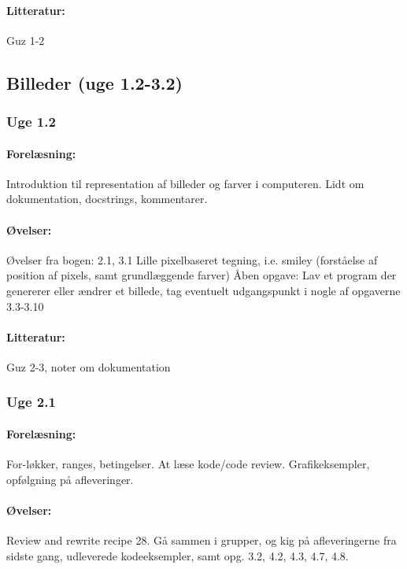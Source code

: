 \documentclass[12pt]{article}
\begin{document}
\paragraph{Litteratur:} Guz 1-2


\subsection{Billeder (uge 1.2-3.2) }


\subsubsection{Uge 1.2}
\paragraph{Forelæsning:} 
Introduktion til representation af billeder og farver i computeren. Lidt om dokumentation, docstrings, kommentarer.

\paragraph{Øvelser:}
Øvelser fra bogen: 2.1, 3.1
Lille pixelbaseret tegning, i.e. smiley (forståelse af position af pixels, samt grundlæggende farver) 
Åben opgave: Lav et program der genererer eller ændrer et billede, tag eventuelt udgangspunkt i nogle af opgaverne 3.3-3.10

\paragraph{Litteratur:} Guz 2-3, noter om dokumentation

\subsubsection{Uge 2.1}
\paragraph{Forelæsning:} 
For-løkker, ranges, betingelser.
At læse kode/code review. 
Grafikeksempler, opfølgning på afleveringer.

\paragraph{Øvelser:} 
Review and rewrite recipe 28.
Gå sammen i grupper, og kig på afleveringerne fra sidste gang, udleverede kodeeksempler, samt opg. 3.2, 4.2, 4.3, 4.7, 4.8.
\end{document}
